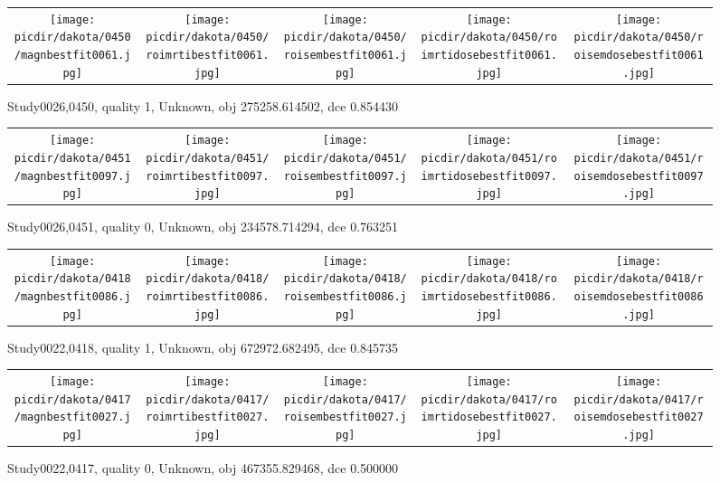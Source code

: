 \documentclass{article}
\newcommand{\picdir}{pdffig}
\begin{document}
\begin{figure} \begin{tabular}{ccccc} \scalebox{0.21}{\texttt{[image: \\picdir/dakota/0450/magnbestfit0061.jpg]}} & \scalebox{0.21}{\texttt{[image: \\picdir/dakota/0450/roimrtibestfit0061.jpg]}} & \scalebox{0.21}{\texttt{[image: \\picdir/dakota/0450/roisembestfit0061.jpg]}}  & \scalebox{0.21}{\texttt{[image: \\picdir/dakota/0450/roimrtidosebestfit0061.jpg]}} & \scalebox{0.21}{\texttt{[image: \\picdir/dakota/0450/roisemdosebestfit0061.jpg]}} \end{tabular} \caption{Study0026,0450, quality 1, Unknown, obj 275258.614502, dce 0.854430  } \label{Study00260450} \end{figure}
\begin{figure} \begin{tabular}{ccccc} \scalebox{0.21}{\texttt{[image: \\picdir/dakota/0451/magnbestfit0097.jpg]}} & \scalebox{0.21}{\texttt{[image: \\picdir/dakota/0451/roimrtibestfit0097.jpg]}} & \scalebox{0.21}{\texttt{[image: \\picdir/dakota/0451/roisembestfit0097.jpg]}}  & \scalebox{0.21}{\texttt{[image: \\picdir/dakota/0451/roimrtidosebestfit0097.jpg]}} & \scalebox{0.21}{\texttt{[image: \\picdir/dakota/0451/roisemdosebestfit0097.jpg]}} \end{tabular} \caption{Study0026,0451, quality 0, Unknown, obj 234578.714294, dce 0.763251  } \label{Study00260451} \end{figure}
\clearpage
\begin{figure} \begin{tabular}{ccccc} \scalebox{0.21}{\texttt{[image: \\picdir/dakota/0418/magnbestfit0086.jpg]}} & \scalebox{0.21}{\texttt{[image: \\picdir/dakota/0418/roimrtibestfit0086.jpg]}} & \scalebox{0.21}{\texttt{[image: \\picdir/dakota/0418/roisembestfit0086.jpg]}}  & \scalebox{0.21}{\texttt{[image: \\picdir/dakota/0418/roimrtidosebestfit0086.jpg]}} & \scalebox{0.21}{\texttt{[image: \\picdir/dakota/0418/roisemdosebestfit0086.jpg]}} \end{tabular} \caption{Study0022,0418, quality 1, Unknown, obj 672972.682495, dce 0.845735  } \label{Study00220418} \end{figure}
\begin{figure} \begin{tabular}{ccccc} \scalebox{0.21}{\texttt{[image: \\picdir/dakota/0417/magnbestfit0027.jpg]}} & \scalebox{0.21}{\texttt{[image: \\picdir/dakota/0417/roimrtibestfit0027.jpg]}} & \scalebox{0.21}{\texttt{[image: \\picdir/dakota/0417/roisembestfit0027.jpg]}}  & \scalebox{0.21}{\texttt{[image: \\picdir/dakota/0417/roimrtidosebestfit0027.jpg]}} & \scalebox{0.21}{\texttt{[image: \\picdir/dakota/0417/roisemdosebestfit0027.jpg]}} \end{tabular} \caption{Study0022,0417, quality 0, Unknown, obj 467355.829468, dce 0.500000  } \label{Study00220417} \end{figure}
\end{document}
